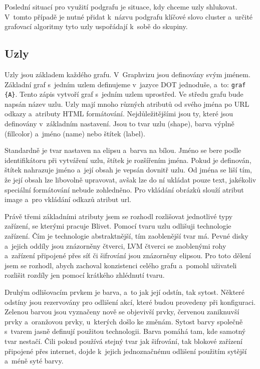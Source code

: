 \documentclass[color,table,oneside,nolot,nolof]{fithesis}
\begin{document}
	Poslední situací pro využití podgrafu je situace, kdy chceme uzly shlukovat. V~tomto případě je nutné přidat k~názvu podgrafu klíčové slovo cluster a~určité grafovací algoritmy tyto uzly 
	uspořádají k~sobě do skupiny.

\subsection{Uzly}
	Uzly jsou základem každého grafu. V~Graphvizu jsou definovány svým jménem. Základní graf s~jedním uzlem definujeme v~jazyce DOT jednoduše, a~to: \texttt{graf \{A\}}. Tento zápis vytvoří
	graf s~jedním uzlem uprostřed. Ve středu grafu bude napsán název uzlu. Uzly mají mnoho různých atributů od svého jména po URL odkazy a~atributy HTML formátování. 
	Nejdůležitějšími jsou ty, které jsou definovány v~základním nastavení. Jsou to tvar uzlu (shape), barva výplně (fillcolor) a~jméno (name) nebo štítek (label). 
	
	Standardně je tvar nastaven na elipsu a~barva
	na bílou. Jméno se bere podle identifikátoru při vytváření uzlu, štítek je rozšířením jména. Pokud je definován, štítek nahrazuje jméno a~její obsah je vepsán dovnitř uzlu. Od jména se liší 
	tím, že její obsah lze libovolně upravovat, avšak lze do ní ukládat pouze text, jakékoliv speciální formátování nebude zohledněno. Pro vkládání obrázků slouží atribut image a~pro vkládání
	odkazů atribut url.

	Právě třemi základními atributy jsem se rozhodl rozlišovat jednotlivé typy zařízení, se kterými pracuje Blivet. Pomocí tvaru uzlu odlišuji technologie zařízení. Čím je technologie
	abstraktnější, tím zaoblenější tvar má. Pevné disky a~jejich oddíly jsou znázorněny čtverci, LVM čtverci se zaoblenými rohy a~zařízení připojené přes síť či šifrování jsou znázorněny elipsou.
	Pro toto dělení jsem se rozhodl, abych zachoval konzistenci celého grafu a~pomohl uživateli rozlišit rozdíly jen pomocí krátkého zhlédnutí tvaru.

	Druhým odlišovacím prvkem je barva, a~to jak její odstín, tak sytost. Některé odstíny jsou rezervovány pro odlišení akcí, které budou provedeny při konfiguraci. Zelenou barvou jsou vyznačeny
	nově se objevivší prvky, červenou zaniknuvší prvky a~oranžovou prvky, u~kterých došlo ke změnám. Sytost barvy společně s~tvarem jasně definují použitou technologii. Barva pomáhá tam, kde
	samotný tvar nestačí. Čili pokud používá stejný tvar jak šifrování, tak blokové zařízení připojené přes internet, dojde k~jejich jednoznačnému odlišení použitím sytější a~méně syté barvy.
\end{document}
